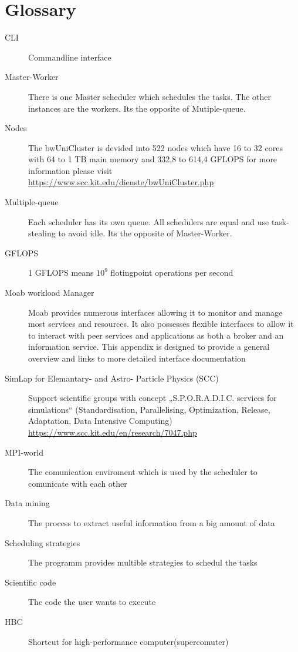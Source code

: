 \section{Glossary}
\begin{description}
	\item[CLI] Commandline interface
	
	\item[Master-Worker] There is one Master scheduler which schedules the tasks. The other instances are the workers. Its the opposite of Mutiple-queue.

	\item[Nodes] The bwUniCluster is devided into 522 nodes which have 16 to 32 cores with 64 to 1 TB main memory and 332,8 to 614,4 GFLOPS for more information please visit \href{https://www.scc.kit.edu/dienste/bwUniCluster.php}{https://www.scc.kit.edu/dienste/bwUniCluster.php}

	\item[Multiple-queue]Each scheduler has its own queue. All schedulers are equal and use task-stealing to avoid idle. Its the opposite of Master-Worker.

	\item[GFLOPS] 1 GFLOPS means $10^9$ flotingpoint operations per second

	\item[Moab workload Manager] Moab provides numerous interfaces allowing it to monitor and manage most services and resources. It also possesses flexible interfaces to allow it to interact with peer services and applications as both a broker and an information service. This appendix is designed to provide a general overview and links to more detailed interface documentation

	\item [SimLap for Elemantary- and Astro-    Particle Physics (SCC)] Support scientific groups with concept „S.P.O.R.A.D.I.C. services for simulations“ (Standardisation, Parallelising, Optimization, Release, Adaptation, Data Intensive Computing) \href {https://www.scc.kit.edu/en/research/7047.php}{https://www.scc.kit.edu/en/research/7047.php}

	\item[MPI-world] The comunication enviroment which is used by the scheduler to comunicate with each other 

	\item[Data mining] The process to extract useful information from a big amount of data

	\item[Scheduling strategies] The programm provides multible strategies to schedul the tasks

	\item[Scientific code] The code the user wants to execute
	
	\item[HBC] Shortcut for high-performance computer(supercomuter)
\end{description}